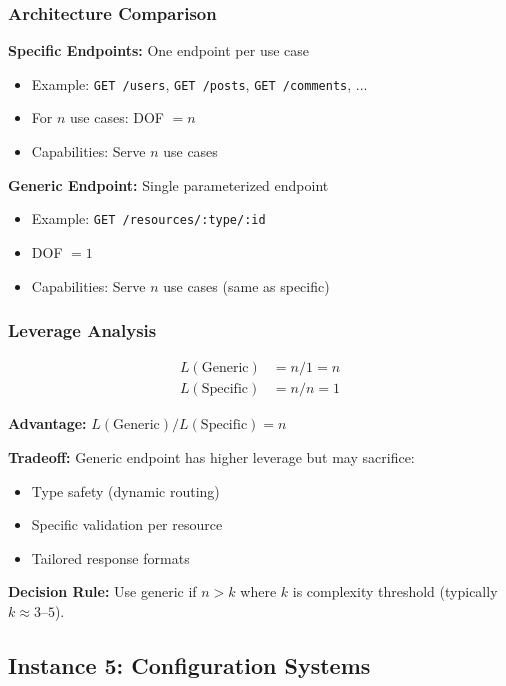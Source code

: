 \subsubsection{Architecture Comparison}

\textbf{Specific Endpoints:} One endpoint per use case
\begin{itemize}
\item Example: \texttt{GET /users}, \texttt{GET /posts}, \texttt{GET /comments}, ...
\item For $n$ use cases: DOF $= n$
\item Capabilities: Serve $n$ use cases
\end{itemize}

\textbf{Generic Endpoint:} Single parameterized endpoint
\begin{itemize}
\item Example: \texttt{GET /resources/:type/:id}
\item DOF $= 1$
\item Capabilities: Serve $n$ use cases (same as specific)
\end{itemize}

\subsubsection{Leverage Analysis}

\begin{align*}
L(\text{Generic}) &= n / 1 = n \\
L(\text{Specific}) &= n / n = 1
\end{align*}

\textbf{Advantage:} $L(\text{Generic}) / L(\text{Specific}) = n$

\textbf{Tradeoff:} Generic endpoint has higher leverage but may sacrifice:
\begin{itemize}
\item Type safety (dynamic routing)
\item Specific validation per resource
\item Tailored response formats
\end{itemize}

\textbf{Decision Rule:} Use generic if $n > k$ where $k$ is complexity threshold (typically $k \approx 3$--$5$).

\subsection{Instance 5: Configuration Systems}

